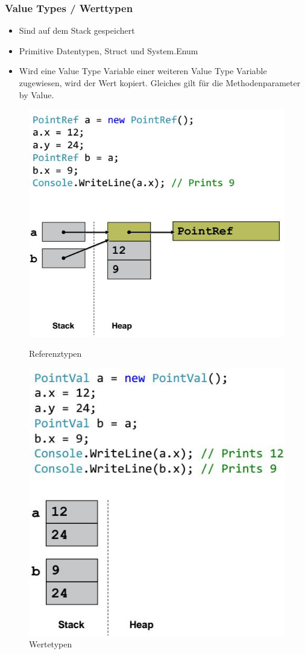 \documentclass[
a4paper,
oneside,
10pt,
fleqn,
headsepline,
toc=listofnumbered, 
bibliography=totocnumbered]{scrartcl}
\begin{document}
\subsubsection{Value Types / Werttypen}
\begin{itemize}
	\item Sind auf dem Stack gespeichert
	\item Primitive Datentypen, Struct und System.Enum
	\item Wird eine Value Type Variable einer weiteren Value Type Variable zugewiesen, wird der Wert kopiert. Gleiches gilt für die Methodenparameter by Value.
\end{itemize}

\begin{figure}[ht!]
	\centering
	\begin{minipage}[t]{0.4\textwidth}
		\centering
		\includegraphics[width=0.8\linewidth]{images/reference_types}
		\caption{Referenztypen}
		\label{fig:searchtreeinsert1}
	\end{minipage}
	\begin{minipage}[t]{0.4\textwidth}
		\centering
		\includegraphics[width=0.8\linewidth]{images/value_types}
		\caption{Wertetypen}
		\label{fig:searchtreeinsert2}
	\end{minipage}
\end{figure}
\end{document}
